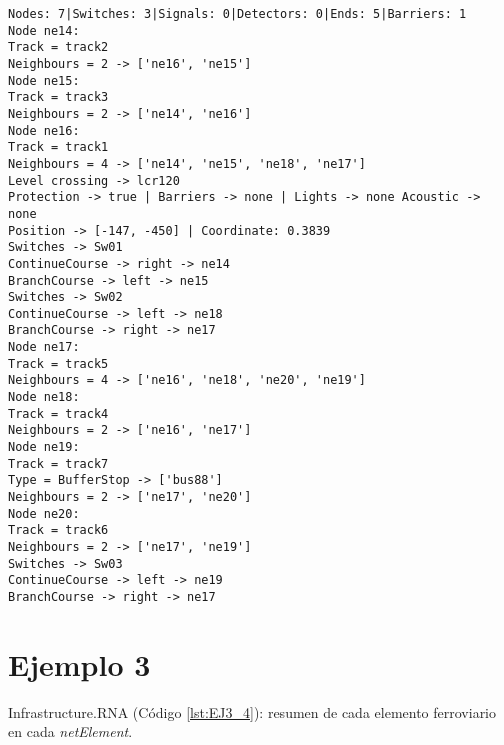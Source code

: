 	\begin{lstlisting}[language = {}, caption = Infrastructure.RNA, label = {lst:EJ2_4}]
Nodes: 7|Switches: 3|Signals: 0|Detectors: 0|Ends: 5|Barriers: 1
Node ne14:
Track = track2
Neighbours = 2 -> ['ne16', 'ne15']
Node ne15:
Track = track3
Neighbours = 2 -> ['ne14', 'ne16']
Node ne16:
Track = track1
Neighbours = 4 -> ['ne14', 'ne15', 'ne18', 'ne17']
Level crossing -> lcr120
Protection -> true | Barriers -> none | Lights -> none Acoustic -> none
Position -> [-147, -450] | Coordinate: 0.3839
Switches -> Sw01
ContinueCourse -> right -> ne14
BranchCourse -> left -> ne15
Switches -> Sw02
ContinueCourse -> left -> ne18
BranchCourse -> right -> ne17
Node ne17:
Track = track5
Neighbours = 4 -> ['ne16', 'ne18', 'ne20', 'ne19']
Node ne18:
Track = track4
Neighbours = 2 -> ['ne16', 'ne17']
Node ne19:
Track = track7
Type = BufferStop -> ['bus88']
Neighbours = 2 -> ['ne17', 'ne20']
Node ne20:
Track = track6
Neighbours = 2 -> ['ne17', 'ne19']
Switches -> Sw03
ContinueCourse -> left -> ne19
BranchCourse -> right -> ne17
	\end{lstlisting}
	\section{Ejemplo 3}
	Infrastructure.RNA (Código \ref{lst:EJ3_4}): resumen de cada elemento ferroviario en cada \textit{netElement}.
	
